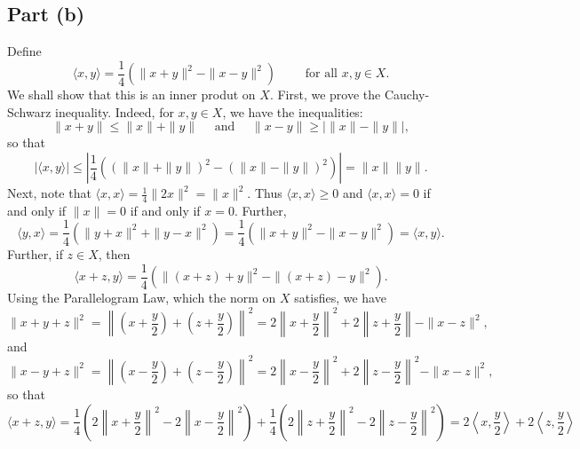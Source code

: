 \documentclass[11pt]{article}
\theoremstyle{thmstyle}
\theoremstyle{defstyle}
\renewcommand{\le}{\leqslant}
\renewcommand{\ge}{\geqslant}
\begin{document}
\subsection{Part (b)}

Define 
\begin{equation*}
    \langle x, y\rangle = \frac{1}{4}\left(\|x + y\|^2 - \|x - y\|^2\right)\qquad\text{ for all } x, y\in X.
\end{equation*}
We shall show that this is an inner produt on $X$. First, we prove the Cauchy-Schwarz inequality. Indeed, for $x, y\in X$, we have the inequalities: 
\begin{equation*}
    \|x + y\|\le \|x\| + \|y\|\quad\text{ and }\quad \|x - y\|\ge\left|\|x\| - \|y\|\right|,
\end{equation*}
so that 
\begin{equation*}
    \left|\langle x, y\rangle\right|\le\left|\frac{1}{4}\left(\left(\|x\| + \|y\|\right)^2 - \left(\|x\| - \|y\|\right)^2\right)\right| = \|x\|\|y\|.
\end{equation*}
Next, note that $\langle x, x\rangle = \frac{1}{4}\|2x\|^2 = \|x\|^2$. Thus $\langle x, x\rangle\ge 0$ and $\langle x,x\rangle = 0$ if and only if $\|x\| = 0$ if and only if $x = 0$. Further, 
\begin{equation*}
    \langle y, x\rangle = \frac{1}{4}\left(\|y + x\|^2 + \|y - x\|^2\right) = \frac{1}{4}\left(\|x + y\|^2 - \|x - y\|^2\right) = \langle x, y\rangle.
\end{equation*}
Further, if $z\in X$, then 
\begin{equation*}
    \langle x + z, y\rangle = \frac{1}{4}\left(\|(x + z) + y\|^2 - \|(x + z) - y\|^2\right).
\end{equation*}
Using the Parallelogram Law, which the norm on $X$ satisfies, we have 
\begin{equation*}
    \|x + y + z\|^2 = \left\|\left(x + \frac{y}{2}\right) + \left(z + \frac{y}{2}\right)\right\|^2 = 2\left\|x + \frac{y}{2}\right\|^2 + 2\left\|z + \frac{y}{2}\right\| - \|x - z\|^2,
\end{equation*}
and 
\begin{equation*}
    \|x - y + z\|^2 = \left\|\left(x - \frac{y}{2}\right) + \left(z - \frac{y}{2}\right)\right\|^2 = 2\left\|x - \frac{y}{2}\right\|^2 + 2\left\|z - \frac{y}{2}\right\|^2 - \|x - z\|^2,
\end{equation*}
so that 
\begin{equation}\tag{$\dagger$}\label{equation}
    \langle x + z, y\rangle = \frac{1}{4}\left(2\left\|x + \frac{y}{2}\right\|^2 - 2\left\|x - \frac{y}{2}\right\|^2\right) + \frac{1}{4}\left(2\left\|z + \frac{y}{2}\right\|^2 - 2\left\|z - \frac{y}{2}\right\|^2\right) = 2\left\langle x, \frac{y}{2}\right\rangle + 2\left\langle z, \frac{y}{2}\right\rangle
\end{equation}
\end{document}
